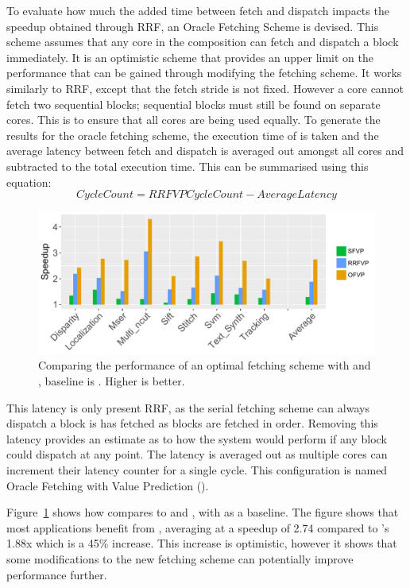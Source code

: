 To evaluate how much the added time between fetch and dispatch impacts the speedup obtained through RRF, an Oracle Fetching Scheme is devised.
This scheme assumes that any core in the composition can fetch and dispatch a block immediately.
It is an optimistic scheme that provides an upper limit on the performance that can be gained through modifying the fetching scheme. 
It works similarly to RRF, except that the fetch stride is not fixed.
However a core cannot fetch two sequential blocks; sequential blocks must still be found on separate cores.
This is to ensure that all cores are being used equally.
To generate the results for the oracle fetching scheme, the execution time of \nfvp{} is taken and the average latency between fetch and dispatch is averaged out amongst all cores and subtracted to the total execution time.
This can be summarised using this equation:
\begin{equation}
CycleCount = RRFVP CycleCount - AverageLatency
\end{equation}

\begin{figure}[t]
    \centering
    \includegraphics[width=1\textwidth]{chapter3/graphics/optres4.pdf}
    \caption{Comparing the performance of an optimal fetching scheme with \vp{} and \nfvp{}, baseline is \novp. Higher is better.}
    \label{fig:opt_scheme}
	\vspace{1em}
\end{figure}
This latency is only present RRF, as the serial fetching scheme can always dispatch a block is has fetched as blocks are fetched in order.
Removing this latency provides an estimate as to how the system would perform if any block could dispatch at any point.
The latency is averaged out as multiple cores can increment their latency counter for a single cycle.
This configuration is named Oracle Fetching with Value Prediction (\optvp).

Figure~\ref{fig:opt_scheme} shows how \optvp{} compares to \vp{} and \nfvp{}, with \novp{} as a baseline.
The figure shows that most applications benefit from \optvp{}, averaging at a speedup of 2.74 compared to \nfvp's 1.88x which is a 45\% increase.
This increase is optimistic, however it shows that some modifications to the new fetching scheme can potentially improve performance further.

